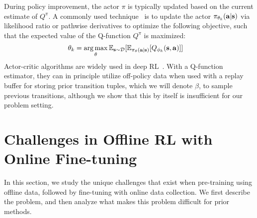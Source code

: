 \documentclass[conference]{IEEEtran}
\begin{document}
During policy improvement, the actor $\pi$ is typically updated based on the current estimate of $Q^\pi$. A commonly used technique~\citep{lillicrap2015continuous, fujimoto2018td3, haarnoja2018sac} is to update the actor $\pi_{\theta_k}(\mathbf{a}|\mathbf{s})$ via likelihood ratio or pathwise derivatives to optimize the following objective, such that the expected value of the Q-function $Q^\pi$ is maximized:
\begin{align} \label{eqn:policy_improvement}
    \theta_k & = \argmax_{\theta} \E_{\st \sim \mathcal{D}}[\E_{\pi_\theta(\at|\st)}[Q_{\phi_k}(\st,\at)]]
\end{align}
Actor-critic algorithms are widely used in deep RL~\citep{mnih2016asynchronous, lillicrap2015continuous, haarnoja2018sac, fujimoto2018td3}. With a Q-function estimator, they can in principle utilize off-policy data when used with a replay buffer for storing prior transition tuples, which we will denote $\beta$, to sample previous transitions, although we show that this by itself is insufficient for our problem setting. 

\section{Challenges in Offline RL with Online Fine-tuning}
\label{sec:challenges}

In this section, we study the unique challenges that exist when pre-training using offline data, followed by fine-tuning with online data collection. We first describe the problem, and then analyze what makes this problem difficult for prior methods.
\end{document}
